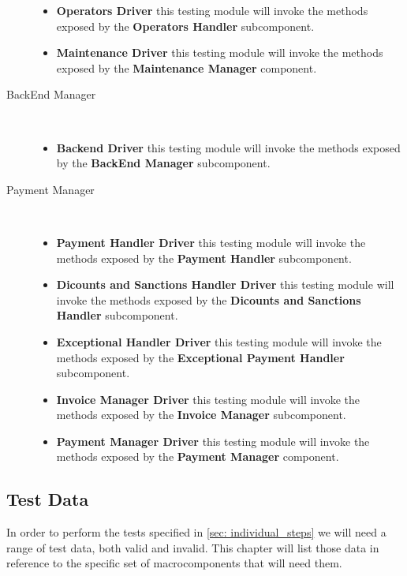 \begin{description}
\begin{itemize}
				\item \textbf{Operators Driver} this testing module will invoke the methods exposed by the \textbf{Operators Handler} subcomponent.
				\item \textbf{Maintenance Driver} this testing module will invoke the methods exposed by the \textbf{Maintenance Manager} component.
			\end{itemize}	
		\item[BackEnd Manager]~\\
			\begin{itemize}
				\item \textbf{Backend Driver} this testing module will invoke the methods exposed by the \textbf{BackEnd Manager} subcomponent.
			\end{itemize}
		\item[Payment Manager]~\\ 
			\begin{itemize}
				\item \textbf{Payment Handler Driver} this testing module will invoke the methods exposed by the \textbf{Payment Handler} subcomponent.
				\item \textbf{Dicounts and Sanctions Handler Driver} this testing module will invoke the methods exposed by the \textbf{Dicounts and Sanctions Handler} subcomponent.
				\item \textbf{Exceptional Handler Driver} this testing module will invoke the methods exposed by the \textbf{Exceptional Payment Handler} subcomponent.
				\item \textbf{Invoice Manager Driver} this testing module will invoke the methods exposed by the \textbf{Invoice Manager} subcomponent.
				\item \textbf{Payment Manager Driver} this testing module will invoke the methods exposed by the \textbf{Payment Manager} component.
			\end{itemize}
		
		\end{description}
		
	
	
	
	\subsection{Test Data}
	
	In order to perform the tests specified in \autoref{sec: individual_steps} we will need a range of test data, both valid and invalid. This chapter will list those data in reference to the specific set of macrocomponents that will need them.
	
